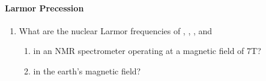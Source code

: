 \documentclass{chem6155problemset}
\begin{document}
\paragraph{Larmor Precession}
   \begin{enumerate}[resume]
   		\item What are the nuclear Larmor frequencies of , , 
		,
		and 
		\begin{enumerate}
			\item in an NMR spectrometer operating at a magnetic field of 7T?
			\item in the earth's magnetic field?
		\end{enumerate}
   \end{enumerate}
	
\end{document}
